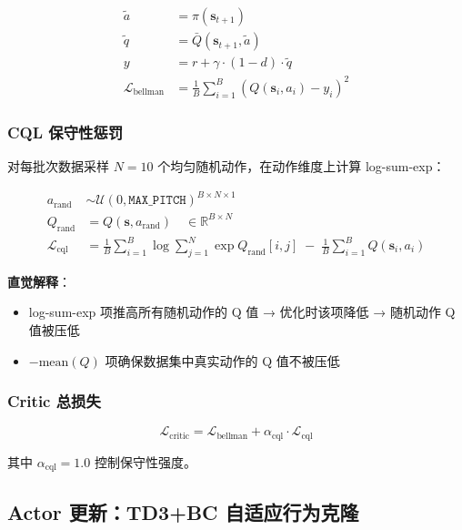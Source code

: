 \documentclass[11pt,a4paper]{ctexart}
\begin{document}
\begin{align}
    \tilde{a} &= \pi(\mathbf{s}_{t+1}) \tag{目标策略动作} \\
    \tilde{q} &= \bar{Q}(\mathbf{s}_{t+1}, \tilde{a}) \tag{目标Q值} \\
    y &= r + \gamma \cdot (1 - d) \cdot \tilde{q} \tag{TD目标} \\
    \mathcal{L}_{\text{bellman}} &= \frac{1}{B}\sum_{i=1}^{B} \left(Q(\mathbf{s}_i, a_i) - y_i\right)^2 \tag{Bellman MSE}
\end{align}

\subsubsection{CQL 保守性惩罚}

对每批次数据采样 $N=10$ 个均匀随机动作，在动作维度上计算 log-sum-exp：

\begin{align}
    a_{\text{rand}} &\sim \mathcal{U}(0, \texttt{MAX\_PITCH})^{B \times N \times 1} \tag{随机动作} \\
    Q_{\text{rand}} &= Q(\mathbf{s}, a_{\text{rand}}) \quad \in \mathbb{R}^{B \times N} \tag{随机动作Q值} \\
    \mathcal{L}_{\text{cql}} &= \frac{1}{B}\sum_{i=1}^{B} \log\sum_{j=1}^{N} \exp Q_{\text{rand}}[i, j] \;-\; \frac{1}{B}\sum_{i=1}^{B} Q(\mathbf{s}_i, a_i) \tag{CQL惩罚}
\end{align}

\textbf{直觉解释}：
\begin{itemize}
    \item log-sum-exp 项推高所有随机动作的 Q 值 → 优化时该项降低 → 随机动作 Q 值被压低
    \item $-\text{mean}(Q)$ 项确保数据集中真实动作的 Q 值不被压低
\end{itemize}

\subsubsection{Critic 总损失}

\begin{equation}
    \mathcal{L}_{\text{critic}} = \mathcal{L}_{\text{bellman}} + \alpha_{\text{cql}} \cdot \mathcal{L}_{\text{cql}}
\end{equation}

其中 $\alpha_{\text{cql}} = 1.0$ 控制保守性强度。

\subsection{Actor 更新：TD3+BC 自适应行为克隆}
\end{document}
